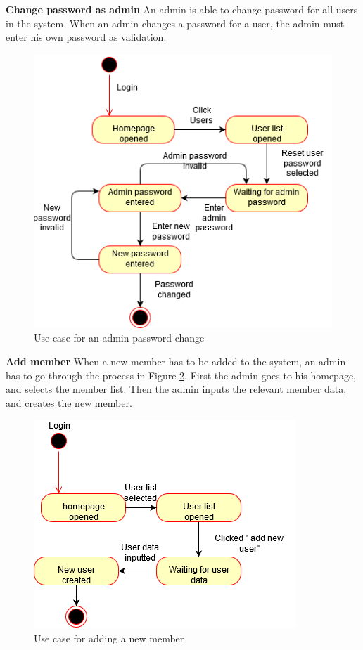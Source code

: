 \noindent
\textbf{Change password as admin}\newline
An admin is able to change password for all users in the system. When an admin changes a password for a user, the admin must enter his own password as validation. 
\begin{figure}[H]
    \centering
    \includegraphics[scale=0.6, clip]{figures/useCaseChangePasswordAdmin.png}
    \caption{Use case for an admin password change}
    \label{fig:useCaseAdminChangePassword}
\end{figure}
\noindent
\textbf{Add member}\newline
When a new member has to be added to the system, an admin has to go through the process in Figure \ref{fig:useCaseAddMember}. First the admin goes to his homepage, and selects the member list. Then the admin inputs the relevant member data, and creates the new member.
\begin{figure}[H]
    \centering
    \includegraphics[scale=0.7, clip]{figures/useCaseAddMember.png}
    \caption{Use case for adding a new member}
    \label{fig:useCaseAddMember}
\end{figure}
\newpage

